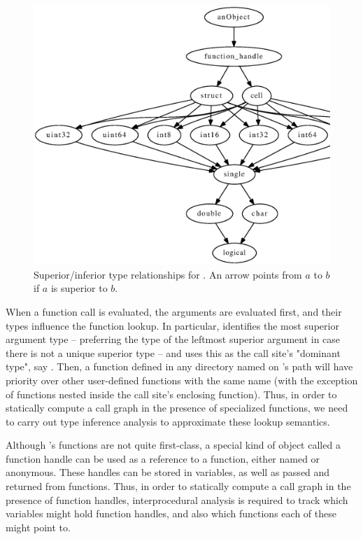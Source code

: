 \begin{figure}[htbp]
\begin{center}
\includegraphics[width=5.2in]{figures/builtinClassRelationships.eps}
\caption{Superior/inferior type relationships for \matlab. An arrow points from
$a$ to $b$ if $a$ is superior to $b$.}
\label{fig:BuiltinClassRelationships}
\end{center}
\end{figure}

When a function call is evaluated, the arguments are evaluated first, and their
types influence the function lookup. In particular, \matlab identifies the most
superior argument type -- preferring the type of the leftmost superior argument
in case there is not a unique superior type -- and uses this as the call site's
"dominant type", say . Then, a function defined in any directory
named  on \matlab's path will have priority over other
user-defined functions with the same name (with the exception of functions
nested inside the call site's enclosing function). Thus, in order to statically
compute a call graph in the presence of specialized functions, we need to carry
out type inference analysis to approximate these lookup semantics.

Although \matlab's functions are not quite first-class, a special kind of
object called a function handle can be used as a reference to a function,
either named or anonymous. These handles can be stored in variables, as well as
passed and returned from functions. Thus, in order to statically compute a call
graph in the presence of function handles, interprocedural analysis is required
to track which variables might hold function handles, and also which functions
each of these might point to.

